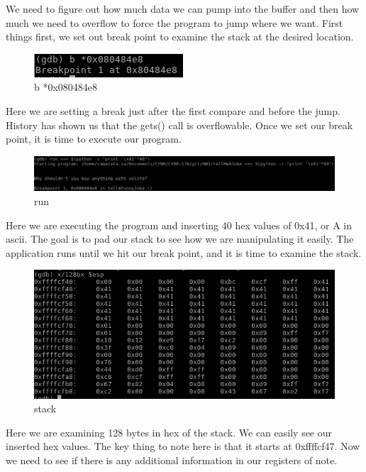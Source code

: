\documentclass[10pt]{article}
\begin{document}
We need to figure out how much data we can pump into the buffer and then how much we need to overflow to force the program to jump where we want.  First things first, we set out break point to examine the stack at the desired location.

\begin{figure}[H]
\centering
\includegraphics[scale=0.5]{./images/ss10.png}
\caption{b *0x080484e8}
\label{fig:Code}
\end{figure}

Here we are setting a break just after the first compare and before the jump.  History has shown us that the gets() call is overflowable.  Once we set our break point, it is time to execute our program.

\begin{figure}[H]
\centering
\includegraphics[scale=0.5]{./images/ss11.png}
\caption{run}
\label{fig:Code}
\end{figure}

Here we are executing the program and inserting 40 hex values of 0x41, or A in ascii.  The goal is to pad our stack to see how we are manipulating it easily.  The application runs until we hit our break point, and it is time to examine the stack.

\begin{figure}[H]
\centering
\includegraphics[scale=0.5]{./images/ss12.png}
\caption{stack}
\label{fig:Code}
\end{figure}

Here we are examining 128 bytes in hex of the stack.  We can easily see our inserted hex values.  The key thing to note here is that it starts at 0xffffcf47.  Now we need to see if there is any additional information in our registers of note.
\end{document}
